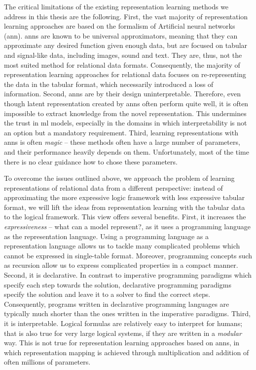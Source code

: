 The critical limitations of the existing representation learning methods we address in this thesis are the  following.
First, the vast majority of representation learning approaches are based on the formalism of Artificial neural networks (\gls{ann}).
\gls{ann}s are known to be universal approximators, meaning that they can approximate any desired function given enough data, but are focused on tabular and signal-like data, including images, sound and text.
They are, thus, not the most suited method for relational data formats.
Consequently, the majority of representation learning approaches for relational data focuses on re-representing the data in the tabular format, which necessarily introduced a loss of information.
Second, \gls{ann}s are by their design uninterpretable.
Therefore, even though latent representation created by \gls{ann}s often perform quite well, it is often impossible to extract knowledge from the novel representation.
This undermines the trust in \gls{ml} models, especially in the domains in which interpretability is not an option but a mandatory requirement.
Third, learning representations with \gls{ann}s is often \textit{magic} --  these methods often have a large number of parameters, and their performance heavily depends on them.
Unfortunately, most of the time there is no clear guidance how to chose these parameters.







To overcome the issues outlined above, we approach the problem of learning representations of relational data from a different perspective: instead of approximating the more expressive logic framework with less expressive tabular format, we will lift the ideas from representation learning with the tabular data to the logical framework.
This view offers several benefits.
First, it  increases the \textit{expressiveness} -- what can a model represent?,  as it uses a programming language as the representation language.
Using a programming language as a representation language allows us to tackle many complicated problems which cannot be expressed in single-table format.
Moreover, programming concepts such as recursion allow us to express complicated properties in a compact manner.
Second, it is declarative.
In contrast to imperative programming paradigms which specify each step towards the solution, declarative programming paradigms specify the solution and leave it to a solver to find the correct steps.
Consequently, programs written in declarative programming languages are typically much shorter than the ones written in the imperative paradigms.
Third, it is interpretable.
Logical formulas are relatively easy to interpret for humans; that is also true for very large logical systems, if they are written in a \textit{modular} way.
This is not true for representation learning approaches based on \gls{ann}s, in which representation mapping is achieved through multiplication and addition of often millions of parameters.



